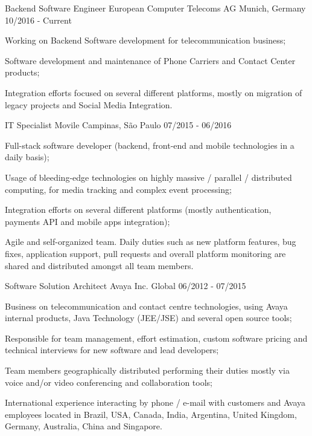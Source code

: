 
\begin{cventries}


\cventry
{Backend Software Engineer}
{European Computer Telecoms AG}
{Munich, Germany}
{10/2016 - Current}
{
\begin{cvitems}
\item Working on Backend Software development for telecommunication business;
\item Software development and maintenance of Phone Carriers and Contact Center products;
\item Integration efforts focused on several different platforms, mostly on migration of legacy projects and Social Media Integration.
\end{cvitems}
}

\cventry
{IT Specialist}
{Movile}
{Campinas, São Paulo}
{07/2015 - 06/2016}
{
\begin{cvitems}
\item Full-stack software developer (backend, front-end and mobile technologies in a daily basis);
\item Usage of bleeding-edge technologies on highly massive / parallel / distributed computing, for media tracking and complex event processing;
\item Integration efforts on several different platforms (mostly authentication, payments API and mobile apps integration);
\item Agile and self-organized team. Daily duties such as new platform features, bug fixes, application support, pull requests and overall platform monitoring are shared and distributed amongst all team members.
\end{cvitems}
}

\cventry
{Software Solution Architect}
{Avaya Inc.}
{Global}
{06/2012 - 07/2015}
{
\begin{cvitems}
\item Business on telecommunication and contact centre technologies, using Avaya internal products, Java Technology (JEE/JSE) and several open source tools;
\item Responsible for team management, effort estimation, custom software pricing and technical interviews for new software and lead developers;
\item Team members geographically distributed performing their duties mostly via voice and/or video conferencing and collaboration tools;
\item International experience interacting by phone / e-mail with customers and Avaya employees located in Brazil, USA, Canada, India, Argentina, United Kingdom, Germany, Australia, China and Singapore.
\end{cvitems}
}


\end{cventries}
